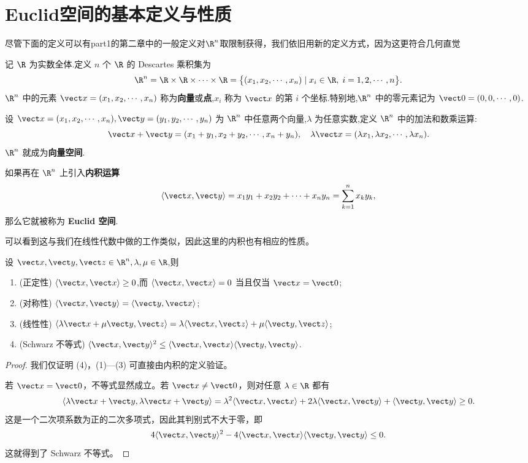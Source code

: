 \section{Euclid空间的基本定义与性质}
尽管下面的定义可以有part1的第二章中的一般定义对$\R^n$取限制获得，我们依旧用新的定义方式，因为这更符合几何直觉


\begin{definition}
记 $\R$ 为实数全体.定义 $n$ 个 $\R$ 的 Descartes 乘积集为
\[
\R^n=\R\times\R\times\cdots\times\R=\bigl\{(x_1,x_2,\cdots,x_n)\mid x_i\in\R,\;i=1,2,\cdots,n\bigr\}.
\]
$\R^n$ 中的元素 $\vect x=(x_1,x_2,\cdots,x_n)$ 称为\textbf{向量}或\textbf{点},$x_i$ 称为 $\vect x$ 的第 $i$ 个坐标.特别地,$\R^n$ 中的零元素记为 $\vect 0=(0,0,\cdots,0)$.

设 $\vect x=(x_1,x_2,\cdots,x_n),\vect y=(y_1,y_2,\cdots,y_n)$ 为 $\R^n$ 中任意两个向量,$\lambda$ 为任意实数,定义 $\R^n$ 中的加法和数乘运算:
\[
\vect x+\vect y=(x_1+y_1,x_2+y_2,\cdots,x_n+y_n),\quad
\lambda\vect x=(\lambda x_1,\lambda x_2,\cdots,\lambda x_n).
\]
$\R^n$ 就成为\textbf{向量空间}.

如果再在 $\R^n$ 上引入\textbf{内积运算}
\[
\langle\vect x,\vect y\rangle=x_1y_1+x_2y_2+\cdots+x_ny_n=\sum_{k=1}^n x_k y_k,
\]
那么它就被称为 \textbf{Euclid 空间}.
\end{definition}
可以看到这与我们在线性代数中做的工作类似，因此这里的内积也有相应的性质。
\begin{proposition}
设 $\vect x,\vect y,\vect z\in\R^n,\lambda,\mu\in\R$,则
\begin{enumerate}
\item[(1)] (正定性) $\langle\vect x,\vect x\rangle\geq0$,而 $\langle\vect x,\vect x\rangle=0$ 当且仅当 $\vect x=\vect 0$;
\item[(2)] (对称性) $\langle\vect x,\vect y\rangle=\langle\vect y,\vect x\rangle$;
\item[(3)] (线性性) $\langle\lambda\vect x+\mu\vect y,\vect z\rangle=\lambda\langle\vect x,\vect z\rangle+\mu\langle\vect y,\vect z\rangle$;
\item[(4)] (Schwarz 不等式) $\langle\vect x,\vect y\rangle^2\leq\langle\vect x,\vect x\rangle\langle\vect y,\vect y\rangle$.
\end{enumerate}
\end{proposition}

\begin{proof}
我们仅证明 (4)，(1)—(3) 可直接由内积的定义验证。

若 $\vect x=\vect 0$，不等式显然成立。若 $\vect x\neq\vect 0$，则对任意 $\lambda\in\R$ 都有
\[
\langle\lambda\vect x+\vect y,\lambda\vect x+\vect y\rangle
=\lambda^2\langle\vect x,\vect x\rangle+2\lambda\langle\vect x,\vect y\rangle+\langle\vect y,\vect y\rangle\geq0.
\]
这是一个二次项系数为正的二次多项式，因此其判别式不大于零，即
\[
4\langle\vect x,\vect y\rangle^2-4\langle\vect x,\vect x\rangle\langle\vect y,\vect y\rangle\leq0.
\]
这就得到了 Schwarz 不等式。
\end{proof}

